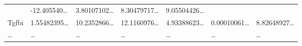 \documentclass[
]{article}
\begin{document}
\begin{longtable}[]{@{}lllllll@{}}
\begin{minipage}[t]{0.12\columnwidth}
\end{minipage} & \begin{minipage}[t]{0.12\columnwidth}\raggedright
-12.405540\ldots{}\strut
\end{minipage} & \begin{minipage}[t]{0.12\columnwidth}\raggedright
3.80107102\ldots{}\strut
\end{minipage} & \begin{minipage}[t]{0.12\columnwidth}\raggedright
8.30479717\ldots{}\strut
\end{minipage} & \begin{minipage}[t]{0.12\columnwidth}\raggedright
9.05504426\ldots{}\strut
\end{minipage}\tabularnewline
\begin{minipage}[t]{0.08\columnwidth}\raggedright
Tgfbi\strut
\end{minipage} & \begin{minipage}[t]{0.12\columnwidth}\raggedright
1.55482395\ldots{}\strut
\end{minipage} & \begin{minipage}[t]{0.12\columnwidth}\raggedright
10.2352866\ldots{}\strut
\end{minipage} & \begin{minipage}[t]{0.12\columnwidth}\raggedright
12.1160976\ldots{}\strut
\end{minipage} & \begin{minipage}[t]{0.12\columnwidth}\raggedright
4.93388623\ldots{}\strut
\end{minipage} & \begin{minipage}[t]{0.12\columnwidth}\raggedright
0.00010061\ldots{}\strut
\end{minipage} & \begin{minipage}[t]{0.12\columnwidth}\raggedright
8.82648927\ldots{}\strut
\end{minipage}\tabularnewline
\begin{minipage}[t]{0.08\columnwidth}\raggedright
\ldots{}\strut
\end{minipage} & \begin{minipage}[t]{0.12\columnwidth}\raggedright
\ldots{}\strut
\end{minipage} & \begin{minipage}[t]{0.12\columnwidth}\raggedright
\ldots{}\strut
\end{minipage} & \begin{minipage}[t]{0.12\columnwidth}\raggedright
\ldots{}\strut
\end{minipage} & \begin{minipage}[t]{0.12\columnwidth}\raggedright
\ldots{}\strut
\end{minipage} & \begin{minipage}[t]{0.12\columnwidth}\raggedright
\ldots{}\strut
\end{minipage} & \begin{minipage}[t]{0.12\columnwidth}\raggedright
\ldots{}\strut
\end{minipage}\tabularnewline
\bottomrule
\end{longtable}
\end{document}
